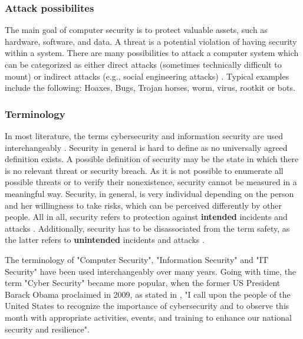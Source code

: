 \subsubsection{Attack possibilites}
The main goal of computer security is to protect valuable assets, such as hardware, software, and data. A threat is a potential violation of having security within a system. There are many possibilities to attack a computer system which can be categorized as either direct attacks (sometimes technically difficult to mount) or indirect attacks (e.g., social engineering attacks) \cite{Bishop2003}. Typical examples include the following: Hoaxes, Bugs, Trojan horses,  worm, virus, rootkit or bots.

\subsubsection{Terminology}
In most literature, the terms cybersecurity and information security are used interchangeably \cite{VonSolms2013}. Security in general is hard to define as no universally agreed definition exists. A possible definition of security may be the state in which there is no relevant threat or security breach. As it is not possible to enumerate all possible threats or to verify their nonexistence, security cannot be measured in a meaningful way. Security, in general, is very individual depending on the person and her willingness to take risks, which can be perceived differently by other people. All in all, security refers to protection against \textbf{intended} incidents and attacks \cite{Bishop2004, Pfleeger2014}. Additionally, security has to be disassociated from the term safety, as the latter refers to \textbf{unintended} incidents and attacks \cite{Bishop2004}.

The terminology of "Computer Security", "Information Security" and "IT Security" have been used interchangeably over many years. Going with time, the term "Cyber Security" became more popular, when the former US President Barack Obama proclaimed in 2009, as stated in \cite{TheWhiteHouse2009}, "I call upon the people of the United States to recognize the importance of cybersecurity and to observe this month with appropriate activities, events, and training to enhance our national security and resilience".









